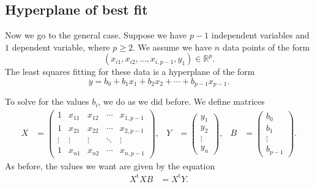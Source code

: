 \documentclass[a4paper, 12pt]{article}
\numberwithin{equation}{section}
\numberwithin{figure}{section}
\theoremstyle{definition}
\renewcommand{\geq}{\geqslant}
\newcommand{\R}{\mathbb{R}}
\newcommand{\tr}{\mathrm{t}}
\begin{document}

\subsection{Hyperplane of best fit}

Now we go to the general case. Suppose we have $p-1$ independent variables and
$1$ dependent variable, where $p\geq 2$. We assume we have $n$ data points of the form 
\[ 
	\left( x_{i1}, x_{i2}, \dots, x_{i,p-1}, y_1 \right) \in \R^p. 
\] 
The least squares fitting for these data is a hyperplane of the form 
\[ 
	y = b_0 + b_1 x_1 + b_2x_2 + \cdots + b_{p-1}x_{p-1}. 
\] 

To solve for the values $b_i$, we do as we did before. We define matrices 
\begin{align*}
	X &= \begin{pmatrix}
		1 & x_{11} & x_{12} & \cdots & x_{1,p-1} \\
		1 & x_{21} & x_{22} & \cdots & x_{2,p-1} \\
		\vdots & \vdots & \vdots & \ddots & \vdots \\
		1 & x_{n1} & x_{n2} & \cdots & x_{n,p-1} 
	\end{pmatrix}, & 
	Y &= \begin{pmatrix}
		y_1 \\ y_2 \\ \vdots \\ y_n 
	\end{pmatrix}, & 
	B &= \begin{pmatrix}
		b_0 \\ b_1 \\ \vdots \\ b_{p-1}
	\end{pmatrix}. 
\end{align*}
As before, the values we want are given by the equation 
\begin{align}\label{eqn:general-OLS}
	X^{\tr} X B &= X^{\tr} Y.
\end{align}
\end{document}

